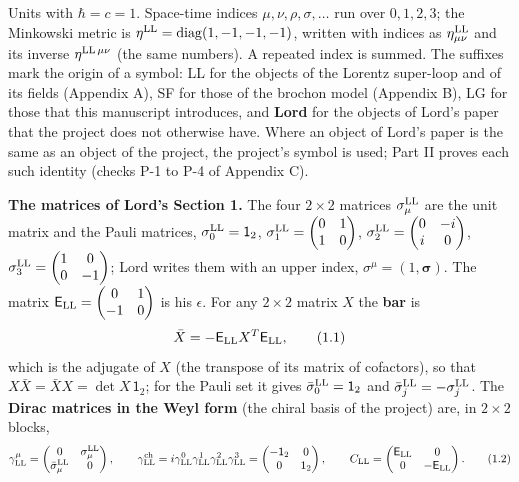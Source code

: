 \documentclass[
  10pt,
]{article}
\begin{document}
Units with \(\hbar=c=1\). Space-time indices
\(\mu,\nu,\rho,\sigma,\dots\) run over \(0,1,2,3\); the Minkowski metric
is \(\eta^{\rm LL}=\mathrm{diag}(1,-1,-1,-1)\), written with indices as
\(\eta^{\rm LL}_{\mu\nu}\) and its inverse \(\eta^{{\rm LL}\,\mu\nu}\)
(the same numbers). A repeated index is summed. The suffixes mark the
origin of a symbol: LL for the objects of the Lorentz super-loop and of
its fields (Appendix A), SF for those of the brochon model (Appendix B),
LG for those that this manuscript introduces, and \textbf{Lord} for the
objects of Lord's paper that the project does not otherwise have. Where
an object of Lord's paper is the same as an object of the project, the
project's symbol is used; Part II proves each such identity (checks P-1
to P-4 of Appendix C).

\textbf{The matrices of Lord's Section 1.} The four \(2\times2\)
matrices \(\sigma^{\rm LL}_\mu\) are the unit matrix and the Pauli
matrices, \(\sigma^{\rm LL}_0=\mathsf 1_2\),
\(\sigma^{\rm LL}_1=\begin{pmatrix}0&1\\1&0\end{pmatrix}\),
\(\sigma^{\rm LL}_2=\begin{pmatrix}0&-i\\i&0\end{pmatrix}\),
\(\sigma^{\rm LL}_3=\begin{pmatrix}1&0\\0&-1\end{pmatrix}\); Lord writes
them with an upper index, \(\sigma^\mu=(1,\boldsymbol\sigma)\). The
matrix \(\mathsf E_{\rm LL}=\begin{pmatrix}0&1\\-1&0\end{pmatrix}\) is
his \(\epsilon\). For any \(2\times2\) matrix \(X\) the \textbf{bar} is
\[\bar X=-\mathsf E_{\rm LL}X^T\mathsf E_{\rm LL},\tag{1.1}\] which is
the adjugate of \(X\) (the transpose of its matrix of cofactors), so
that \(X\bar X=\bar XX=\det X\,\mathsf 1_2\); for the Pauli set it gives
\(\bar\sigma^{\rm LL}_0=\mathsf 1_2\) and
\(\bar\sigma^{\rm LL}_j=-\sigma^{\rm LL}_j\). The \textbf{Dirac matrices
in the Weyl form} (the chiral basis of the project) are, in \(2\times2\)
blocks,
\[\gamma^\mu_{\rm LL}=\begin{pmatrix}0&\sigma^{\rm LL}_\mu\\\bar\sigma^{\rm LL}_\mu&0\end{pmatrix},\qquad
\gamma^{\rm ch}_{\rm LL}=i\gamma^0_{\rm LL}\gamma^1_{\rm LL}\gamma^2_{\rm LL}\gamma^3_{\rm LL}=\begin{pmatrix}-\mathsf 1_2&0\\0&\mathsf 1_2\end{pmatrix},\qquad
C_{\rm LL}=\begin{pmatrix}\mathsf E_{\rm LL}&0\\0&-\mathsf E_{\rm LL}\end{pmatrix}.\tag{1.2}\]
\end{document}

